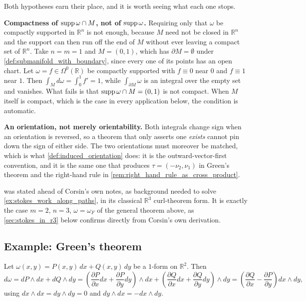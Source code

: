 \begin{ainote}
\label{note:stokes_hypotheses_are_load_bearing}
Both hypotheses earn their place, and it is worth seeing what each one stops.

\textbf{Compactness of $\operatorname{supp}\omega \cap M$, not of $\operatorname{supp}\omega$.} Requiring only that $\omega$
be compactly supported in $\mathbb{R}^n$ is not enough, because $M$ need not be closed in
$\mathbb{R}^n$ and the support can then run off the end of $M$ without ever leaving a compact set
of $\mathbb{R}^n$. Take $n = m = 1$ and $M = (0,1)$, which has $\partial M = \emptyset$ under
\cref{def:submanifold_with_boundary}, since every one of its points has an open chart. Let
$\omega = f \in \Omega^0(\mathbb{R})$ be compactly supported with $f \equiv 0$ near $0$ and
$f \equiv 1$ near $1$. Then $\int_M d\omega = \int_0^1 f' = 1$, while $\int_{\partial M}\omega$
is an integral over the empty set and vanishes. What fails is that $\operatorname{supp}\omega \cap M = (0,1)$
is not compact. When $M$ itself is compact, which is the case in every application below,
the condition is automatic.

\textbf{An orientation, not merely orientability.} Both integrals change sign when an orientation
is reversed, so a theorem that only asserts one \emph{exists} cannot pin down the sign of either
side. The two orientations must moreover be matched, which is what
\cref{def:induced_orientation} does: it is the outward-vector-first convention, and it is the
same one that produces $\tau = (-\nu_2,\nu_1)$ in Green's theorem and the right-hand rule in
\cref{rem:right_hand_rule_as_cross_product}.
\end{ainote}

\begin{ainote}
 was stated ahead of Corsin's own notes, as background
needed to solve \cref{ex:stokes_work_along_paths}, in its classical $\mathbb{R}^3$ curl-theorem form. It is
exactly the case $m=2$, $n=3$, $\omega=\omega_F$ of the general theorem above, as
\cref{sec:stokes_in_r3} below confirms directly from Corsin's own derivation.
\end{ainote}

\subsection{Example: Green's theorem}
\label{sec:green_theorem_example}

\begin{example}
\label{ex:exterior_derivative_r2}
Let $\omega(x,y) = P(x,y)\,dx + Q(x,y)\,dy$ be a $1$-form on $\mathbb{R}^2$. Then
\[
d\omega = dP\wedge dx + dQ\wedge dy = \left(\frac{\partial P}{\partial x}dx +
  \frac{\partial P}{\partial y}dy\right)\wedge dx + \left(\frac{\partial Q}{\partial x}dx +
  \frac{\partial Q}{\partial y}dy\right)\wedge dy = \left(\frac{\partial Q}{\partial x} -
  \frac{\partial P}{\partial y}\right) dx\wedge dy,
\]
using $dx\wedge dx = dy\wedge dy = 0$ and $dy\wedge dx = -dx\wedge dy$.
\end{example}

